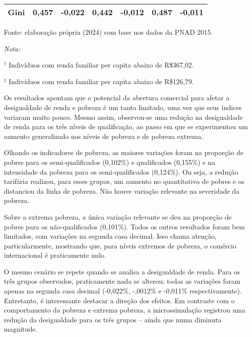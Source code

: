 \begin{table}[h]
\begin{adjustwidth}{-1.5cm}{}
\begin{threeparttable}
\begin{tabular}{lcccccc}
	\hspace{0.2cm} Gini                           & 0,457 & -0,022 & 0,442 & -0,012 & 0,487 & -0,011 \\[3pt] \hline
	\end{tabular}
	\begin{tablenotes}
		\footnotesize
		\item Fonte: elaboração própria (2024) com base nos dados da PNAD 2015.
		\item \textit{Nota:}
		\item \hspace{0.2cm} $^{\dag}$     Indivíduos com renda familiar per capita abaixo de R\$367,02.
		\item \hspace{0.2cm} $^{\ddagger}$ Indivíduos com renda familiar per capita abaixo de R\$126,79.
	\end{tablenotes}
	\end{threeparttable}
	\end{adjustwidth}
\end{table}

Os resultados apontam que o potencial da abertura comercial para afetar a desigualdade de renda e pobreza é um tanto limitado, uma vez que seus índices variaram muito pouco. Mesmo assim, observou-se uma redução na desigualdade de renda para os três níveis de qualificação, ao passo em que se experimentou um aumento generalizado nos níveis de pobreza e de pobreza extrema.

Olhando os indicadores de pobreza, as maiores variações foram na proporção de pobres para os semi-qualificados (0,102\%) e qualificados (0,155\%) e na intensidade da pobreza para os semi-qualificados (0,124\%). Ou seja, a redução tarifária realizou, para esses grupos, um aumento no quantitativo de pobres e os distanciou da linha de pobreza. Não houve variação relevante na severidade da pobreza.

Sobre a extrema pobreza, a única variação relevante se deu na proporção de pobres para os não-qualificados (0,101\%). Todos os outros resultados foram bem limitados, com variações na segunda casa decimal. Isso chama atenção, particularmente, mostrando que, para níveis extremos de pobreza, o comércio internacional é praticamente nulo.

O mesmo cenário se repete quando se analisa a desigualdade de renda. Para os três grupos observados, praticamente nada se alterou: todas as variações foram apenas na segunda casa decimal (-0,022\%, -,0012\% e -0,011\% respectivamente). Entretanto, é interessante destacar a direção dos efeitos. Em contraste com o comportamento da pobreza e extrema pobreza, a microssimulação registrou uma redução da desigualdade para os três grupos -- ainda que numa diminuta magnitude.

